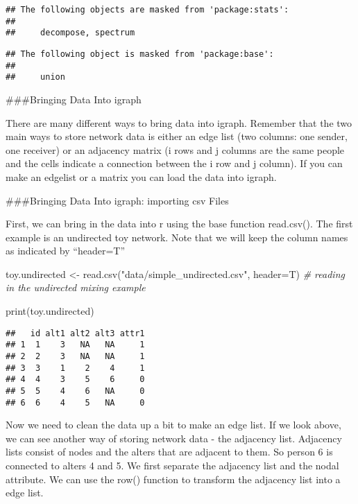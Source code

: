 \documentclass[
]{article}
\newenvironment{Shaded}{\begin{snugshade}}{\end{snugshade}}
\newcommand{\AttributeTok}[1]{\textcolor[rgb]{0.77,0.63,0.00}{#1}}
\newcommand{\CommentTok}[1]{\textcolor[rgb]{0.56,0.35,0.01}{\textit{#1}}}
\newcommand{\FunctionTok}[1]{\textcolor[rgb]{0.00,0.00,0.00}{#1}}
\newcommand{\NormalTok}[1]{#1}
\newcommand{\OtherTok}[1]{\textcolor[rgb]{0.56,0.35,0.01}{#1}}
\newcommand{\StringTok}[1]{\textcolor[rgb]{0.31,0.60,0.02}{#1}}
\begin{document}
\begin{verbatim}
## The following objects are masked from 'package:stats':
## 
##     decompose, spectrum
\end{verbatim}

\begin{verbatim}
## The following object is masked from 'package:base':
## 
##     union
\end{verbatim}

\#\#\#Bringing Data Into igraph

There are many different ways to bring data into igraph. Remember that
the two main ways to store network data is either an edge list (two
columns: one sender, one receiver) or an adjacency matrix (i rows and j
columns are the same people and the cells indicate a connection between
the i row and j column). If you can make an edgelist or a matrix you can
load the data into igraph.

\#\#\#Bringing Data Into igraph: importing csv Files

First, we can bring in the data into r using the base function
read.csv(). The first example is an undirected toy network. Note that we
will keep the column names as indicated by ``header=T''

\begin{Shaded}
\begin{Highlighting}[]
\NormalTok{toy.undirected }\OtherTok{\textless{}{-}} \FunctionTok{read.csv}\NormalTok{(}\StringTok{"data/simple\_undirected.csv"}\NormalTok{, }\AttributeTok{header=}\NormalTok{T)   }\CommentTok{\# reading in the undirected mixing example}

\FunctionTok{print}\NormalTok{(toy.undirected)}
\end{Highlighting}
\end{Shaded}

\begin{verbatim}
##   id alt1 alt2 alt3 attr1
## 1  1    3   NA   NA     1
## 2  2    3   NA   NA     1
## 3  3    1    2    4     1
## 4  4    3    5    6     0
## 5  5    4    6   NA     0
## 6  6    4    5   NA     0
\end{verbatim}

Now we need to clean the data up a bit to make an edge list. If we look
above, we can see another way of storing network data - the adjacency
list. Adjacency lists consist of nodes and the alters that are adjacent
to them. So person 6 is connected to alters 4 and 5. We first separate
the adjacency list and the nodal attribute. We can use the row()
function to transform the adjacency list into a edge list.
\end{document}
